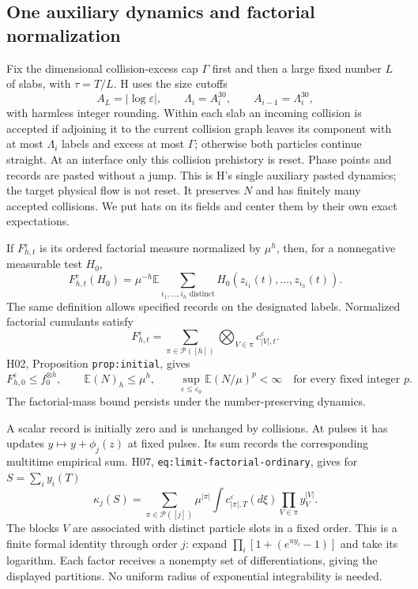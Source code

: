 \documentclass[11pt]{article}
\newcommand{\E}{\mathbb E}
\newcommand{\eps}{\varepsilon}
\newcommand{\calP}{\mathcal P}
\theoremstyle{definition}\newtheorem{definition}[theorem]{Definition}
\theoremstyle{remark}\newtheorem{remark}[theorem]{Remark}
\numberwithin{equation}{section}
\begin{document}
\subsection{One auxiliary dynamics and factorial normalization}
Fix the dimensional collision-excess cap $\Gamma$ first and then a large
fixed number $L$ of slabs, with $\tau=T/L$. H uses the size cutoffs
\begin{equation}\label{eq:cutoffs}
 A_L=|\log\eps|,\qquad \Lambda_i=A_i^{30},\qquad
 A_{i-1}=\Lambda_i^{30},
\end{equation}
with harmless integer rounding. Within each slab an incoming collision is
accepted if adjoining it to the current collision graph leaves its component
with at most $\Lambda_i$ labels and excess at most $\Gamma$; otherwise both
particles continue straight. At an interface only this collision prehistory
is reset. Phase points and records are pasted without a jump. This is H's
single auxiliary pasted dynamics; the target physical flow is not reset.
It preserves $N$ and has finitely many accepted collisions. We put hats on
its fields and center them by their own exact expectations.

If $F_{h,t}^\eps$ is its ordered factorial measure normalized by $\mu^h$,
then, for a nonnegative measurable test $H_0$,
\[
 F_{h,t}^\eps(H_0)=\mu^{-h}\E
       \sum_{i_1,\ldots,i_h\text{ distinct}}H_0(z_{i_1}(t),\ldots,z_{i_h}(t)).
\]
The same definition allows specified records on the designated labels.
Normalized factorial cumulants satisfy
\begin{equation}\label{eq:partition}
 F_{h,t}^\eps=\sum_{\pi\in\calP([h])}
                   \bigotimes_{V\in\pi}c_{|V|,t}^\eps.
\end{equation}
H02, Proposition \texttt{prop:initial}, gives
\begin{equation}\label{eq:N}
 F_{h,0}^\eps\le f_0^{\otimes h},\qquad
 \E(N)_h\le\mu^h,\qquad
 \sup_{\eps\le\eps_0}\E(N/\mu)^p<\infty
       \quad\text{for every fixed integer }p.
\end{equation}
The factorial-mass bound persists under the number-preserving dynamics.

A scalar record is initially zero and is unchanged by collisions. At pulses it has updates
$y\mapsto y+\phi_j(z)$ at fixed pulses. Its sum records the corresponding
multitime empirical sum. H07, \texttt{eq:limit-factorial-ordinary}, gives
for $S=\sum_i y_i(T)$
\begin{equation}\label{eq:ordinary}
 \kappa_j(S)=\sum_{\pi\in\calP([j])}\mu^{|\pi|}
     \int c_{|\pi|,T}^\eps(d\xi)
                    \prod_{V\in\pi}y_V^{|V|}.
\end{equation}
The blocks $V$ are associated with distinct particle slots in a fixed order.
This is a finite formal identity through order $j$: expand
$\prod_i[1+(e^{u y_i}-1)]$ and take its logarithm. Each factor receives a
nonempty set of differentiations, giving the displayed partitions. No
uniform radius of exponential integrability is needed.
\end{document}

